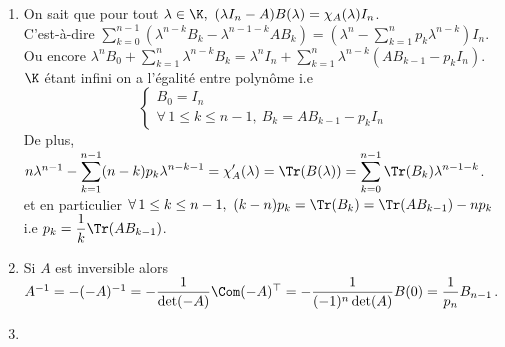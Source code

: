 \documentclass[8pt]{book}
\begin{document}
\begin{enumerate}[leftmargin=*]
		Enfin, comme $A$ n'a qu'un nombre fini de valeur propre, par continuité des deux membres, qui sont des expressions polynomiales en $\lambda$, $\forall \lambda\in \K,\ \Tr(B(\lambda))=\chi_A'(\lambda)$.
		\item On sait que pour tout $\lambda\in \K,\ (\lambda I_n-A)B(\lambda)=\chi_A(\lambda)I_n$.\\
		C'est-à-dire $\displaystyle\sum_{k=0}^{n-1}\left(\lambda^{n-k}B_k-\lambda^{n-1-k}AB_k\right)=\left(\lambda^n-\sum_{k=1}^np_k\lambda^{n-k}\right)I_n$.\\
		Ou encore $\lambda^nB_0+\displaystyle\sum_{k=1}^n\lambda^{n-k}B_k=\lambda^nI_n+\sum_{k=1}^n\lambda^{n-k}(AB_{k-1}-p_kI_n)$.\\
		$\K$ étant infini on a l'égalité entre polynôme i.e
		$$\begin{cases}
			B_0=I_n\\
			\forall\, 1\leq k\leq n-1,\ B_k=AB_{k-1}-p_kI_n
		\end{cases}$$
		De plus, $n\lambda^{n-1}-\displaystyle\sum_{k=1}^{n-1}(n-k)p_k\lambda^{n-k-1}=\chi_A'(\lambda)=\Tr(B(\lambda))=\sum_{k=0}^{n-1}\Tr(B_k)\lambda^{n-1-k}$.\\
		et en particulier $\forall\, 1\leq k\leq n-1,\ (k-n)p_k=\Tr(B_k)=\Tr(AB_{k-1})-np_k$ i.e $p_k=\dfrac{1}{k}\Tr(AB_{k-1})$.
		\item Si $A$ est inversible alors $A^{-1}=-(-A)^{-1}=-\dfrac{1}{\det(-A)}\Com(-A)^\top=-\dfrac{1}{(-1)^n\det(A)}B(0)=\dfrac{1}{p_n}B_{n-1}$.
		\item 
	\end{enumerate}
	
\end{document}
